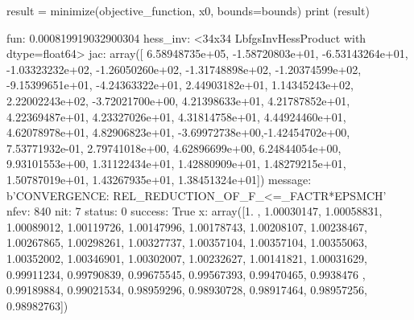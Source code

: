 \begin{solution}
\begin{ipython}
result = minimize(objective_function, x0, bounds=bounds)
print (result)
\end{ipython}
\begin{ioutput}
     fun: 0.000819919032900304
hess_inv: <34x34 LbfgsInvHessProduct with dtype=float64>
     jac: array([ 6.58948735e+05, -1.58720803e+01, -6.53143264e+01, 
                 -1.03323232e+02, -1.26050260e+02, -1.31748898e+02, 
                 -1.20374599e+02, -9.15399651e+01, -4.24363322e+01,  
                  2.44903182e+01,  1.14345243e+02,  2.22002243e+02,
                 -3.72021700e+00,  4.21398633e+01,  4.21787852e+01,  
                  4.22369487e+01,  4.23327026e+01,  4.31814758e+01,  
                  4.44924460e+01,  4.62078978e+01,  4.82906823e+01, 
                  -3.69972738e+00,-1.42454702e+00,  7.53771932e-01,
                  2.79741018e+00,  4.62896699e+00,  6.24844054e+00,  
                  9.93101553e+00,  1.31122434e+01,  1.42880909e+01,  
                  1.48279215e+01,  1.50787019e+01,  1.43267935e+01,  
                  1.38451324e+01])
 message: b'CONVERGENCE: REL\_REDUCTION\_OF\_F\_<=\_FACTR*EPSMCH'
    nfev: 840
     nit: 7
  status: 0
 success: True
       x: array([1.        , 1.00030147, 1.00058831, 1.00089012, 1.00119726,
                 1.00147996, 1.00178743, 1.00208107, 1.00238467, 1.00267865,
                 1.00298261, 1.00327737, 1.00357104, 1.00357104, 1.00355063,
                 1.00352002, 1.00346901, 1.00302007, 1.00232627, 1.00141821,
                 1.00031629, 0.99911234, 0.99790839, 0.99675545, 0.99567393,
                 0.99470465, 0.9938476 , 0.99189884, 0.99021534, 0.98959296,
                 0.98930728, 0.98917464, 0.98957256, 0.98982763])
\end{ioutput}
\end{solution}

